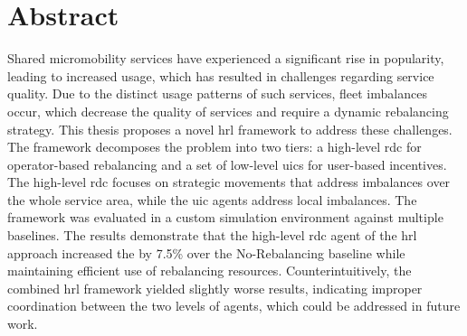 \chapter*{Abstract}

Shared micromobility services have experienced a significant rise in popularity, leading to increased usage, which has resulted in challenges regarding service quality.
Due to the distinct usage patterns of such services, fleet imbalances occur, which decrease the quality of services and require a dynamic rebalancing strategy.
This thesis proposes a novel \gls{hrl} framework to address these challenges.
The framework decomposes the problem into two tiers: a high-level \gls{rdc} for operator-based rebalancing and a set of low-level \glspl{uic} for user-based incentives.
The high-level \gls{rdc} focuses on strategic movements that address imbalances over the whole service area, while the \gls{uic} agents address local imbalances.
The framework was evaluated in a custom simulation environment against multiple baselines.
The results demonstrate that the high-level \gls{rdc} agent of the \gls{hrl} approach increased the  by 7.5\% over the No-Rebalancing baseline while maintaining efficient use of rebalancing resources.
Counterintuitively, the combined \gls{hrl} framework yielded slightly worse results, indicating improper coordination between the two levels of agents, which could be addressed in future work.
